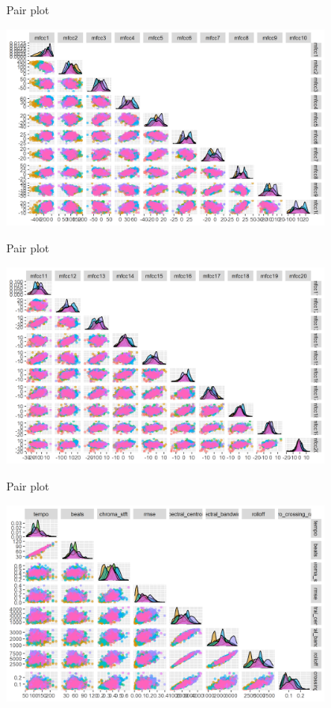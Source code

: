 \documentclass[11pt]{beamer}
\begin{document}
\begin{frame}{Pair plot}
\begin{center}
    \includegraphics[width=0.8\textwidth]{ggpairs2.png}
\end{center}
\end{frame}
\begin{frame}{Pair plot}
\begin{center}
    \includegraphics[width=0.8\textwidth]{ggpairs3.png}
\end{center}
\end{frame}
\begin{frame}{Pair plot}
\begin{center}
    \includegraphics[width=0.8\textwidth]{ggpairs1.png}
\end{center}
\end{frame}
\end{document}
